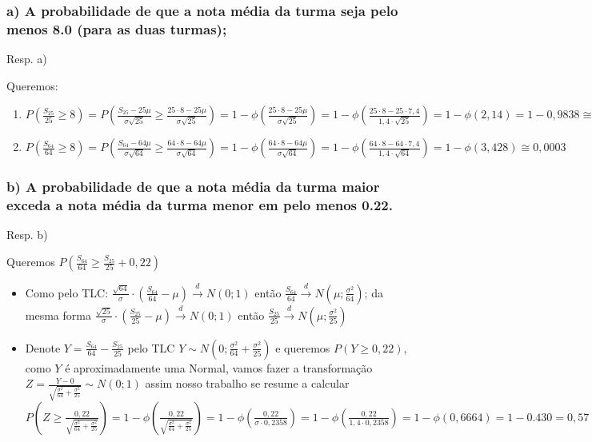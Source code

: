 \documentclass[portuguese]{article}
\begin{document}
\subsubsection*{\textmd{a) A probabilidade de que a nota média da turma seja pelo
menos 8.0 (para as duas turmas);}}

Resp. a)

Queremos: 
\begin{enumerate}
\item $P(\frac{S_{25}}{25}\ge8)=P(\frac{S_{25}-25\mu}{\sigma\sqrt{25}}\ge\frac{25\cdot8-25\mu}{\sigma\sqrt{25}})=1-\phi(\frac{25\cdot8-25\mu}{\sigma\sqrt{25}})=1-\phi(\frac{25\cdot8-25\cdot7,4}{1,4\cdot\sqrt{25}})=1-\phi(2,14)=1-0,9838\cong0,016$
\item $P(\frac{S_{64}}{64}\ge8)=P(\frac{S_{64}-64\mu}{\sigma\sqrt{64}}\ge\frac{64\cdot8-64\mu}{\sigma\sqrt{64}})=1-\phi(\frac{64\cdot8-64\mu}{\sigma\sqrt{64}})=1-\phi(\frac{64\cdot8-64\cdot7,4}{1,4\cdot\sqrt{64}})=1-\phi(3,428)\cong0,0003$
\end{enumerate}

\subsubsection*{\textmd{b) A probabilidade de que a nota média da turma maior exceda
a nota média da turma menor em pelo menos 0.22.}}

Resp. b) 

Queremos $P(\frac{S_{64}}{64}\ge\frac{S_{25}}{25}+0,22)$
\begin{itemize}
\item Como pelo TLC: $\frac{\sqrt{64}}{\sigma}\cdot(\frac{S_{64}}{64}-\mu)\overset{d}{\to}N(0;1)$
então $\frac{S_{64}}{64}\overset{d}{\to}N(\mu;\frac{\sigma^{2}}{64})$;
da mesma forma $\frac{\sqrt{25}}{\sigma}\cdot(\frac{S_{25}}{25}-\mu)\overset{d}{\to}N(0;1)$
então $\frac{S_{25}}{25}\overset{d}{\to}N(\mu;\frac{\sigma^{2}}{25})$
\item Denote $Y=\frac{S_{64}}{64}-\frac{S_{25}}{25}$ pelo TLC $Y\sim N(0;\frac{\sigma^{2}}{64}+\frac{\sigma^{2}}{25})$
e queremos $P(Y\ge0,22)$, como $Y$ é aproximadamente uma Normal,
vamos fazer a transformação $Z=\frac{Y-0}{\sqrt{\frac{\sigma^{2}}{64}+\frac{\sigma^{2}}{25}}}\sim N(0;1)$
assim nosso trabalho se resume a calcular $P(Z\ge\frac{0,22}{\sqrt{\frac{\sigma^{2}}{64}+\frac{\sigma^{2}}{25}}})=1-\phi(\frac{0,22}{\sqrt{\frac{\sigma^{2}}{64}+\frac{\sigma^{2}}{25}}})=1-\phi(\frac{0,22}{\sigma\cdot0,2358})=1-\phi(\frac{0,22}{1,4\cdot0,2358})=1-\phi(0,6664)=1-0.430=0,57$
\end{itemize}
\end{document}
